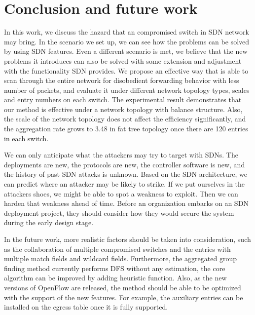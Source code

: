 \chapter{Conclusion and future work}
\label{conclusion}
In this work, we discuss the hazard that an compromised switch in SDN network may bring. In the scenario we set up, we can see how the problems can be solved by using SDN features. Even a different scenario is met, we believe that the new problems it introduces can also be solved with some extension and adjustment with the functionality SDN provides. We propose an effective way that is able to scan through the entire network for disobedient forwarding behavior with less number of packets, and evaluate it under different network topology types, scales and entry numbers on each switch. The experimental result demonstrates that our method is effective under a network topology with balance structure. Also, the scale of the network topology does not affect the efficiency significantly, and the aggregation rate grows to 3.48 in fat tree topology once there are 120 entries in each switch. 

We can only anticipate what the attackers may try to target with SDNs. The deployments are new, the protocols are new, the controller software is new, and the history of past SDN attacks is unknown. Based on the SDN architecture, we can predict where an attacker may be likely to strike. If we put ourselves in the attacker\textquotesingle s shoes, we might be able to spot a weakness to exploit. Then we can harden that weakness ahead of time. Before an organization embarks on an SDN deployment project, they should consider how they would secure the system during the early design stage. 

In the future work, more realistic factors should be taken into consideration, such as the collaboration of multiple compromised switches and the entries with multiple match fields and wildcard fields. Furthermore, the aggregated group finding method currently performs DFS without any estimation, the core algorithm can be improved by adding heuristic function. Also, as the new versions of OpenFlow are released, the method should be able to be optimized with the support of the new features. For example, the auxiliary entries can be installed on the egress table once it is fully supported.
